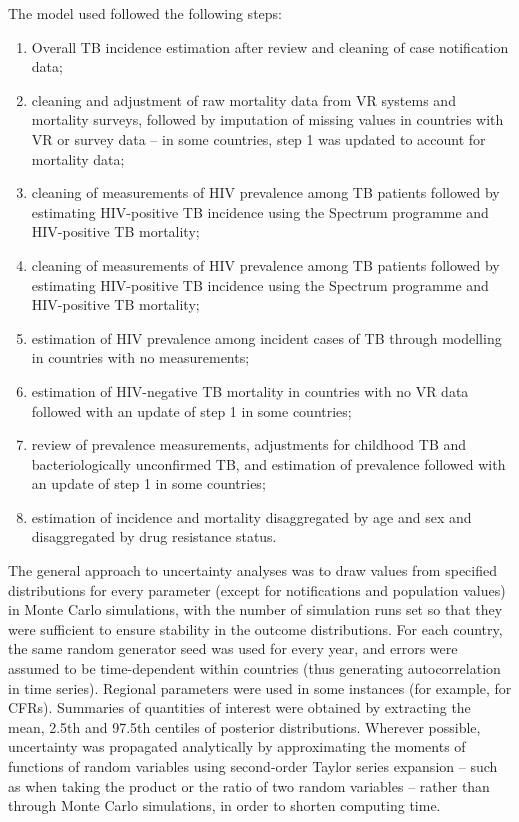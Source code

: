 The model used followed the following steps: 

\begin{enumerate}
\item Overall TB incidence estimation after review and cleaning of case notification data;
\item cleaning and adjustment of raw mortality data from VR systems and mortality surveys, followed by imputation of missing values in countries with VR or survey data – in some countries, step 1 was updated to account for mortality data;
\item cleaning of measurements of HIV prevalence among TB patients followed by estimating HIV-positive TB incidence using the Spectrum programme and HIV-positive TB mortality;
\item cleaning of measurements of HIV prevalence among TB patients followed by estimating HIV-positive TB incidence using the Spectrum programme and HIV-positive TB mortality;
\item estimation of HIV prevalence among incident cases of TB through modelling in countries with no measurements;
\item estimation of HIV-negative TB mortality in countries with no VR data followed with an update of step 1 in some countries; 
\item review of prevalence measurements, adjustments for childhood TB and bacteriologically unconfirmed TB,  and estimation of prevalence followed with an update of step 1 in some countries; 
\item estimation of incidence and mortality disaggregated by age and sex and disaggregated by drug resistance status.
\end{enumerate}

The general approach to uncertainty analyses was to draw values from specified distributions for every parameter (except for notifications and population values) in Monte Carlo simulations, with the number of simulation runs set so that they were sufficient to ensure stability in the outcome distributions. For each country, the same random generator seed was used for every year, and errors were assumed to be time-dependent within countries (thus generating autocorrelation in time series). Regional parameters were used in some instances (for example, for CFRs). Summaries of quantities of interest were obtained by extracting the mean, 2.5th and 97.5th centiles of posterior distributions. Wherever possible, uncertainty was propagated analytically by approximating the moments of functions of random variables using second-order Taylor series expansion – such as when taking the product or the ratio of two random variables – rather than through Monte Carlo simulations, in order to shorten computing time. 

